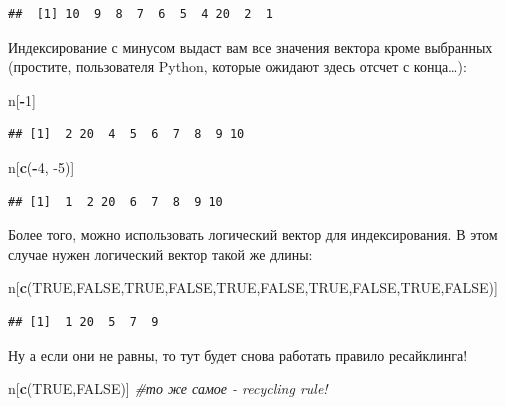 \documentclass[]{book}
\newenvironment{Shaded}{\begin{snugshade}}{\end{snugshade}}
\newcommand{\CommentTok}[1]{\textcolor[rgb]{0.56,0.35,0.01}{\textit{#1}}}
\newcommand{\DecValTok}[1]{\textcolor[rgb]{0.00,0.00,0.81}{#1}}
\newcommand{\KeywordTok}[1]{\textcolor[rgb]{0.13,0.29,0.53}{\textbf{#1}}}
\newcommand{\NormalTok}[1]{#1}
\newcommand{\OperatorTok}[1]{\textcolor[rgb]{0.81,0.36,0.00}{\textbf{#1}}}
\newcommand{\OtherTok}[1]{\textcolor[rgb]{0.56,0.35,0.01}{#1}}
\begin{document}
\begin{verbatim}
##  [1] 10  9  8  7  6  5  4 20  2  1
\end{verbatim}

Индексирование с минусом выдаст вам все значения вектора кроме выбранных (простите, пользователя Python, которые ожидают здесь отсчет с конца\ldots):

\begin{Shaded}
\begin{Highlighting}[]
\NormalTok{n[}\OperatorTok{-}\DecValTok{1}\NormalTok{]}
\end{Highlighting}
\end{Shaded}

\begin{verbatim}
## [1]  2 20  4  5  6  7  8  9 10
\end{verbatim}

\begin{Shaded}
\begin{Highlighting}[]
\NormalTok{n[}\KeywordTok{c}\NormalTok{(}\OperatorTok{-}\DecValTok{4}\NormalTok{, }\DecValTok{-5}\NormalTok{)]}
\end{Highlighting}
\end{Shaded}

\begin{verbatim}
## [1]  1  2 20  6  7  8  9 10
\end{verbatim}

Более того, можно использовать логический вектор для индексирования. В этом случае нужен логический вектор такой же длины:

\begin{Shaded}
\begin{Highlighting}[]
\NormalTok{n[}\KeywordTok{c}\NormalTok{(}\OtherTok{TRUE}\NormalTok{,}\OtherTok{FALSE}\NormalTok{,}\OtherTok{TRUE}\NormalTok{,}\OtherTok{FALSE}\NormalTok{,}\OtherTok{TRUE}\NormalTok{,}\OtherTok{FALSE}\NormalTok{,}\OtherTok{TRUE}\NormalTok{,}\OtherTok{FALSE}\NormalTok{,}\OtherTok{TRUE}\NormalTok{,}\OtherTok{FALSE}\NormalTok{)]}
\end{Highlighting}
\end{Shaded}

\begin{verbatim}
## [1]  1 20  5  7  9
\end{verbatim}

Ну а если они не равны, то тут будет снова работать правило ресайклинга!

\begin{Shaded}
\begin{Highlighting}[]
\NormalTok{n[}\KeywordTok{c}\NormalTok{(}\OtherTok{TRUE}\NormalTok{,}\OtherTok{FALSE}\NormalTok{)] }\CommentTok{#то же самое - recycling rule!}
\end{Highlighting}
\end{Shaded}
\end{document}
